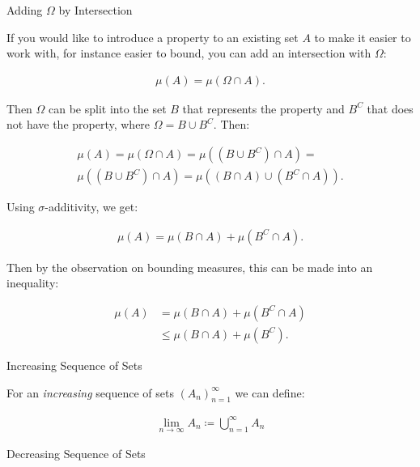 \documentclass[10pt,landscape]{article}
\renewcommand{\leq}{\leqslant}
\begin{document}
\begin{multicols}{3}
\begin{observation}{}{Adding $\Omega$ by Intersection}

    If you would like to introduce a property to an existing set $A$ to make it easier to work with, for instance easier to bound, you can add an intersection with $\Omega$:

        \begin{align*}
            \mu(A) = \mu(\Omega \cap A).
        \end{align*}

    Then $\Omega$ can be split into the set $B$ that represents the property and $B^C$ that does not have the property, where $\Omega = B \cup B^C$. Then:

        \begin{align*}
            \mu(A) = \mu(\Omega \cap A) = \mu((B \cup B^C) \cap A) = \\
            \mu((B \cup B^C) \cap A) = \mu((B \cap A) \cup (B^C \cap A)).
        \end{align*}

    Using $\sigma$-additivity, we get:

        \begin{align*}
            \mu(A) = \mu(B \cap A) + \mu(B^C \cap A).
        \end{align*}

    Then by the observation on bounding measures, this can be made into an inequality:

        \begin{align*}
            \mu(A) &= \mu(B \cap A) + \mu(B^C \cap A) \\
            &\leq \mu(B \cap A) + \mu(B^C).
        \end{align*}

\end{observation}

\begin{observation}{}{Increasing Sequence of Sets}

    For an \emph{increasing} sequence of sets $(A_n)_{n=1}^{\infty}$ we can define:

        \begin{align*}
            \lim_{n \to \infty} A_n \coloneqq \bigcup_{n=1}^{\infty} A_n
        \end{align*}

\end{observation}

\begin{observation}{}{Decreasing Sequence of Sets}


\end{observation}
\end{multicols}
\end{document}
